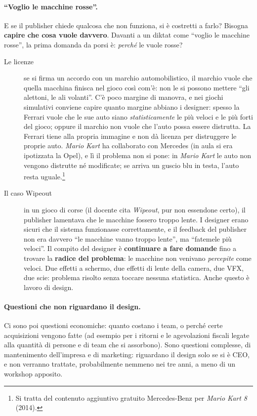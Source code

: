 \paragraph{``Voglio le macchine rosse''.} E se il publisher chiede qualcosa
che non funziona, si è costretti a farlo? Bisogna \textbf{capire che cosa
vuole davvero}. Davanti a un diktat come ``voglio le macchine rosse'', la
prima domanda da porsi è: \emph{perché} le vuole rosse?

\begin{description}
  \item[Le licenze] se si firma un accordo con un marchio automobilistico, il
        marchio vuole che quella macchina finisca nel gioco così com'è: non
        le si possono mettere ``gli alettoni, le ali volanti''. C'è poco
        margine di manovra, e nei giochi simulativi conviene capire quanto
        margine abbiano i designer: spesso la Ferrari vuole che le sue auto
        siano \emph{statisticamente} le più veloci e le più forti del gioco;
        oppure il marchio non vuole che l'auto possa essere distrutta. La
        Ferrari tiene alla propria immagine e non dà licenza per distruggere
        le proprie auto. \emph{Mario Kart} ha collaborato con Mercedes (in
        aula si era ipotizzata la Opel), e lì il problema non si pone: in
        \emph{Mario Kart} le auto non vengono distrutte né modificate; se
        arriva un guscio blu in testa, l'auto resta uguale.\footnote{Si tratta
        del contenuto aggiuntivo gratuito Mercedes-Benz per \emph{Mario Kart
        8} (2014).}
  \item[Il caso Wipeout] in un gioco di corse (il docente cita
        \emph{Wipeout}, pur non essendone certo), il publisher lamentava che
        le macchine fossero troppo lente. I designer erano sicuri che il
        sistema funzionasse correttamente, e il feedback del publisher non era
        davvero ``le macchine vanno troppo lente'', ma ``fatemele più
        veloci''. Il compito del designer è \textbf{continuare a fare
        domande} fino a trovare la \textbf{radice del problema}: le macchine
        non venivano \emph{percepite} come veloci. Due effetti a schermo, due
        effetti di lente della camera, due VFX, due scie: problema risolto
        senza toccare nessuna statistica. Anche questo è lavoro di design.
\end{description}

\paragraph{Questioni che non riguardano il design.} Ci sono poi questioni
economiche: quanto costano i team, o perché certe acquisizioni vengono fatte
(ad esempio per i ritorni e le agevolazioni fiscali legate alla quantità di
persone e di team che si assorbono). Sono questioni complesse, di
mantenimento dell'impresa e di marketing: riguardano il design solo se si è
CEO, e non verranno trattate, probabilmente nemmeno nei tre anni, a meno di un
workshop apposito.

